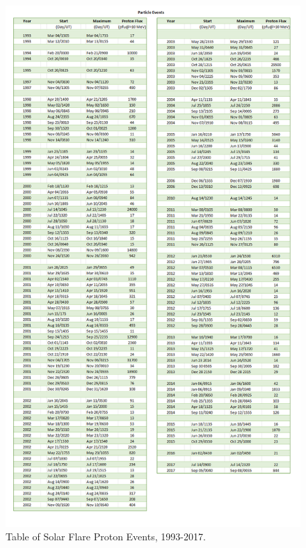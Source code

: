 \documentclass[11pt]{article}
\begin{document}
\begin{figure}[H]
    \centering
        \includegraphics[width=.75\linewidth]{SolarFlareEvents02.png}
        \caption{Table of Solar Flare Proton Events, 1993-2017.}
        \label{fig:SP02}
\end{figure}


\printbibliography[prenote=myprenote]
\end{document}
